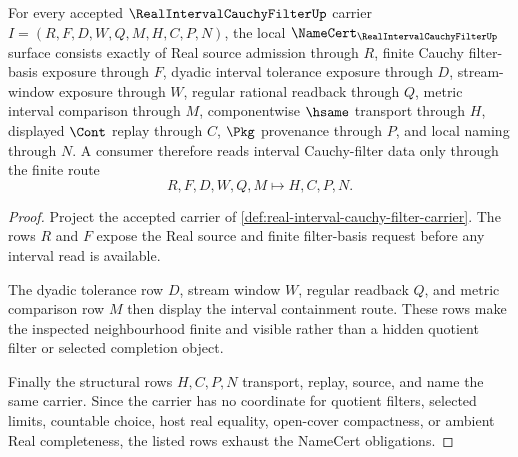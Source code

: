 \begin{theorem}
\label{thm:real-interval-cauchy-filter-namecert-obligations}
For every accepted $\RealIntervalCauchyFilterUp$ carrier $I=(R,F,D,W,Q,M,H,C,P,N)$, the local $\NameCert_{\RealIntervalCauchyFilterUp}$ surface consists exactly of Real source admission through $R$, finite Cauchy filter-basis exposure through $F$, dyadic interval tolerance exposure through $D$, stream-window exposure through $W$, regular rational readback through $Q$, metric interval comparison through $M$, componentwise $\hsame$ transport through $H$, displayed $\Cont$ replay through $C$, $\Pkg$ provenance through $P$, and local naming through $N$. A consumer therefore reads interval Cauchy-filter data only through the finite route
$$
R,F,D,W,Q,M \longmapsto H,C,P,N .
$$
\end{theorem}
\begin{proof}
Project the accepted carrier of \autoref{def:real-interval-cauchy-filter-carrier}. The rows $R$ and $F$ expose the Real source and finite filter-basis request before any interval read is available.

The dyadic tolerance row $D$, stream window $W$, regular readback $Q$, and metric comparison row $M$ then display the interval containment route. These rows make the inspected neighbourhood finite and visible rather than a hidden quotient filter or selected completion object.

Finally the structural rows $H,C,P,N$ transport, replay, source, and name the same carrier. Since the carrier has no coordinate for quotient filters, selected limits, countable choice, host real equality, open-cover compactness, or ambient Real completeness, the listed rows exhaust the NameCert obligations.
\end{proof}

